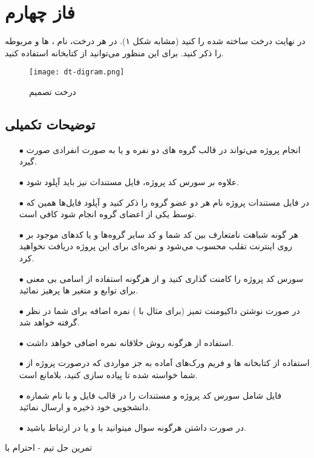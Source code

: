 \documentclass{article}
\begin{document}
	\section{فاز چهارم}
	در نهایت درخت ساخته شده را  کنید (مشابه شکل ۱). در هر  درخت، نام ، ها   و  مربوطه را ذکر کنید. برای این منظور می‌توانید از کتابخانه   استفاده کنید.
	\begin{figure}
		\centerline{\texttt{[image: dt-digram.png]}}
		\caption{درخت تصمیم}
		\label{fig}
	\end{figure}
	 
	
	\subsection*{توضیحات تکمیلی}
	\begin{itemize}
		\item [$\bullet$] انجام پروژه می‌تواند در قالب گروه های دو نفره و یا به صورت انفرادی صورت گیرد.
		
		\item [$\bullet$] علاوه بر سورس کد پروژه، فایل مستندات  نیز باید آپلود شود.
		
		\item [$\bullet$] در فایل مستندات پروژه نام هر دو عضو گروه را ذکر کنید و آپلود فایل‌ها همین که توسط یکی از اعضای گروه انجام شود کافی است.
		
		\item [$\bullet$] هر گونه شباهت نامتعارف بین کد شما و کد سایر گروه‌ها و یا کدها‌ی موجود بر روی اینترنت تقلب محسوب می‌شود و نمره‌ای برای این پروژه دریافت نخواهید کرد.
		
		\item [$\bullet$] سورس کد پروژه را کامنت گذاری کنید و از هرگونه استفاده از اسامی بی معنی برای توابع و متغیر ها پرهیز نمائيد.
		
		\item [$\bullet$] در صورت نوشتن داکیومنت تمیز (برای مثال با \lr{\LaTeX}) نمره اضافه برای شما در نظر گرفته خواهد شد.
		
		\item [$\bullet$] استفاده از هرگونه روش خلاقانه نمره اضافی خواهد داشت.
		
		\item [$\bullet$] استفاده از کتابخانه ها و فریم ورک‌های آماده به جز مواردی که درصورت پروژه از شما خواسته شده تا پیاده سازی کنید، بلامانع است.
		
		\item [$\bullet$] فایل شامل سورس کد پروژه و مستندات را در قالب فایل  و با نام شماره دانشجویی خود ذخیره و ارسال نمائید.
		
				\item [$\bullet$] در صورت داشتن هرگونه سوال میتوانید با  و یا  در ارتباط باشید.
				\newline
	\end{itemize}
	
	\begin{LTR}
		
		تمرین حل تیم - احترام با
	\end{LTR}
		

	
\end{document}
